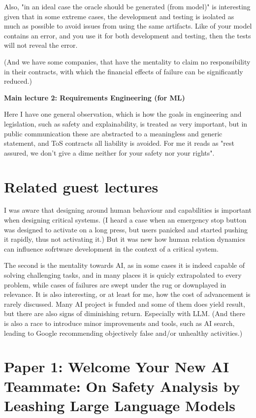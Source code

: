 \documentclass{article}
\begin{document}
Also, "in an ideal case the oracle should be generated (from model)" is interesting given that in some extreme cases, the development and testing is isolated as much as possible to avoid issues from using the same artifacts.
Like of your model contains an error, and you use it for both development and testing, then the tests will not reveal the error.

(And we have some companies, that have the mentality to claim no responsibility in their contracts, with which the  financial effects of failure can be significantly reduced.)

\textbf{Main lecture 2: Requirements Engineering (for ML)}

\noindent
Here I have one general observation, which is how the goals in engineering and legislation, such as safety and explainability, is treated as very important, but in public communication these are abstracted to a meaningless and generic statement, and ToS contracts all liability is avoided.
For me it reads as "rest assured, we don't give a dime neither for your safety nor your rights".

\section{Related guest lectures}

I was aware that designing around human behaviour and capabilities is important when designing critical systems. (I heard a case when an emergency stop button was designed to activate on a long press, but users panicked and started pushing it rapidly, thus not activating it.)
But it was new how human relation dynamics can influence sofrtware development in the context of a critical system.

The second is the mentality towards AI, as in some cases it is indeed capable of solving challenging tasks, and in many places it is quicly extrapolated to every problem, while cases of failures are swept under the rug or downplayed in relevance. 
It is also interesting, or at least for me, how the cost of advancement is rarely discussed. 
Many AI project is funded and some of them does yield result, but there are also signs of diminishing return. 
Especially with LLM.
(And there is also a race to introduce minor improvements and tools, such as AI search, leading to Google recommending objectively false and/or unhealthy activities.)


\section{Paper 1: Welcome Your New AI Teammate: On Safety Analysis by Leashing Large Language Models}
\end{document}
